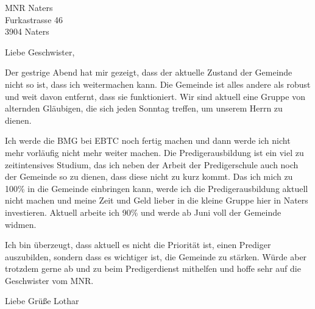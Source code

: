 \documentclass[private]{scrlttr2}
\begin{document}


\begin{letter}{
  MNR Naters \\
  Furkastrasse 46 \\
  3904 Naters
}

\opening{Liebe Geschwister,}

Der gestrige Abend hat mir gezeigt, dass der aktuelle Zustand der Gemeinde nicht so ist, dass ich weitermachen kann. Die Gemeinde ist alles andere als robust und weit davon entfernt, dass sie funktioniert. Wir sind aktuell eine Gruppe von alternden Gläubigen, die sich jeden Sonntag treffen, um unserem Herrn zu dienen.

Ich werde die BMG bei EBTC noch fertig machen und dann werde ich nicht mehr vorläufig nicht mehr weiter machen. Die Predigerausbildung ist ein viel zu zeitintensives Studium, das ich neben der Arbeit der Predigerschule auch noch der Gemeinde so zu dienen, dass diese nicht zu kurz kommt. Das ich mich zu 100\% in die Gemeinde einbringen kann, werde ich die Predigerausbildung aktuell nicht machen und meine Zeit und Geld lieber in die kleine Gruppe hier in Naters investieren. Aktuell arbeite ich 90\% und werde ab Juni voll der Gemeinde widmen.

Ich bin überzeugt, dass aktuell es nicht die Priorität ist, einen Prediger auszubilden, sondern dass es wichtiger ist, die Gemeinde zu stärken. Würde aber trotzdem gerne ab und zu beim Predigerdienst mithelfen und hoffe sehr auf die Geschwister vom MNR.

\closing{Liebe Grüße Lothar}

\end{letter}
\end{document}
